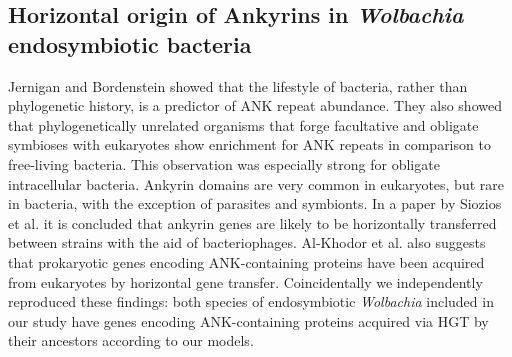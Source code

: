 \subsection{Horizontal origin of Ankyrins in \textit{Wolbachia} endosymbiotic
bacteria}
\label{horizontal_origin}
Jernigan and Bordenstein \cite{Jernigan2014} showed that the lifestyle of
bacteria, rather than phylogenetic history, is a predictor of ANK repeat
abundance. They also showed that phylogenetically unrelated organisms that
forge facultative and obligate symbioses with eukaryotes show enrichment for
ANK repeats in comparison to free-living bacteria. This observation was
especially strong for obligate intracellular bacteria. Ankyrin domains are very
common in eukaryotes, but rare in bacteria, with the exception of parasites and
symbionts. In a paper by Siozios et al. \cite{Siozios2013} it is concluded that
ankyrin genes are likely to be horizontally transferred between strains with
the aid of bacteriophages. Al-Khodor et al. \cite{Al-Khodor2010} also suggests
that prokaryotic genes encoding ANK-containing proteins have been acquired from
eukaryotes by horizontal gene transfer. Coincidentally we independently
reproduced these findings: both species of endosymbiotic \textit{Wolbachia}
included in our study have genes encoding ANK-containing proteins acquired via
HGT by their ancestors according to our models.
